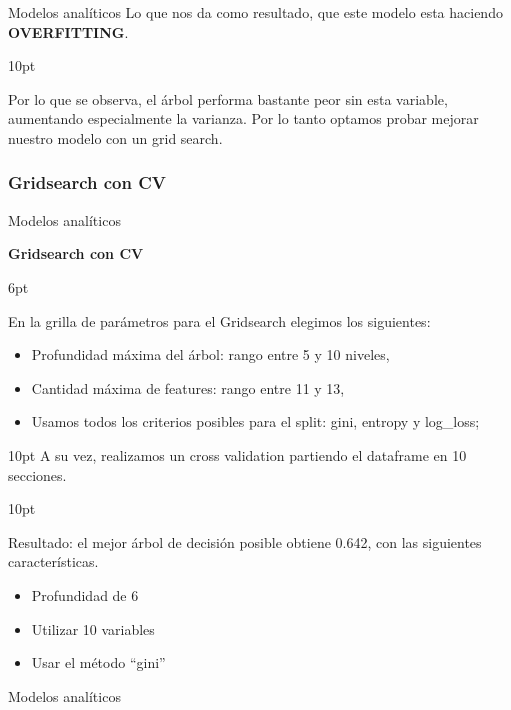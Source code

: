 \documentclass[pdf]{beamer}
\def\vspace{}%
\begin{document}
{\begin{frame}{Modelos analíticos}
    Lo que nos da como resultado, que este modelo esta haciendo \textbf{OVERFITTING}.

\vspace{10pt}

    Por lo que se observa, el árbol performa bastante peor sin esta variable, aumentando especialmente la varianza. Por lo tanto optamos probar mejorar nuestro modelo con un grid search.

\end{frame}

\subsubsection{Gridsearch con CV}

\begin{frame}{Modelos analíticos}
    \begin{Large}
        \textbf{Gridsearch con CV}
    \end{Large}
    \vspace{6pt}
    
    En la grilla de parámetros para el Gridsearch elegimos los siguientes:
    \begin{itemize}
        \item Profundidad máxima del árbol: rango entre 5 y 10 niveles,
        \item Cantidad máxima de features: rango entre 11 y 13,
        \item Usamos todos los criterios posibles para el split: gini, entropy y log\_loss;
    \end{itemize}

\vspace{10pt}
    A su vez, realizamos un cross validation partiendo el dataframe en 10 secciones.

\vspace{10pt}

    Resultado: el mejor árbol de decisión posible obtiene 0.642, con las siguientes características.
    
    \begin{itemize}
        \item Profundidad de  6
        \item Utilizar  10  variables 
        \item Usar el método ``gini''
    \end{itemize}
\end{frame}

\begin{frame}{Modelos analíticos}
    

\end{frame}}
\end{document}
